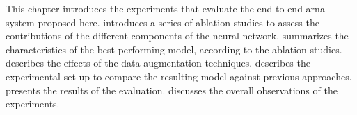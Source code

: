 
This chapter introduces the experiments that evaluate the
end-to-end \gls{arna} system proposed here.
 introduces a series of ablation
studies to assess the contributions of the different
components of the neural network.
 summarizes the
characteristics of the best performing model, according to
the ablation studies. 
describes the effects of the data-augmentation techniques.
 describes the
experimental set up to compare the resulting model 
against previous approaches.  presents the
results of the evaluation.  discusses the
overall observations of the experiments. 
